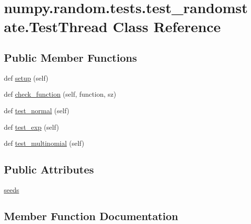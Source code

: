 \hypertarget{classnumpy_1_1random_1_1tests_1_1test__randomstate_1_1TestThread}{}\section{numpy.\+random.\+tests.\+test\+\_\+randomstate.\+Test\+Thread Class Reference}
\label{classnumpy_1_1random_1_1tests_1_1test__randomstate_1_1TestThread}
\subsection*{Public Member Functions}
\begin{DoxyCompactItemize}
\item 
def \hyperlink{classnumpy_1_1random_1_1tests_1_1test__randomstate_1_1TestThread_a9183bfc3c6c72da6936da7b9b679c453}{setup} (self)
\item 
def \hyperlink{classnumpy_1_1random_1_1tests_1_1test__randomstate_1_1TestThread_a26f2d8a99e6a45f1ac98f8162b18e0f6}{check\+\_\+function} (self, function, sz)
\item 
def \hyperlink{classnumpy_1_1random_1_1tests_1_1test__randomstate_1_1TestThread_a9077ddf9cb0542b81f8921388b4322a4}{test\+\_\+normal} (self)
\item 
def \hyperlink{classnumpy_1_1random_1_1tests_1_1test__randomstate_1_1TestThread_ac1a865a100a26c5104c036e50e4a5567}{test\+\_\+exp} (self)
\item 
def \hyperlink{classnumpy_1_1random_1_1tests_1_1test__randomstate_1_1TestThread_ae71cba0cb88b0415c2675b3fb825d979}{test\+\_\+multinomial} (self)
\end{DoxyCompactItemize}
\subsection*{Public Attributes}
\begin{DoxyCompactItemize}
\item 
\hyperlink{classnumpy_1_1random_1_1tests_1_1test__randomstate_1_1TestThread_a74737a0c67f1974aa14cd33ace75e851}{seeds}
\end{DoxyCompactItemize}


\subsection{Member Function Documentation}
\mbox{\label{classnumpy_1_1random_1_1tests_1_1test__randomstate_1_1TestThread_a26f2d8a99e6a45f1ac98f8162b18e0f6}} 
